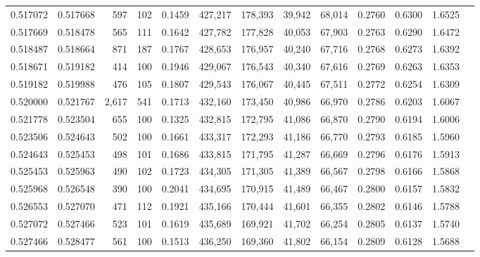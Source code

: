 \begin{tabular}{rrrrrrrrrrrrr}
0.517072 & 0.517668 &   597 & 102 &                                     0.1459 & 427,217 & 178,393 &  39,942 &  68,014 & 0.2760 & 0.6300 & 1.6525 \\
0.517669 & 0.518478 &   565 & 111 &                                     0.1642 & 427,782 & 177,828 &  40,053 &  67,903 & 0.2763 & 0.6290 & 1.6472 \\
0.518487 & 0.518664 &   871 & 187 &                                     0.1767 & 428,653 & 176,957 &  40,240 &  67,716 & 0.2768 & 0.6273 & 1.6392 \\
0.518671 & 0.519182 &   414 & 100 &                                     0.1946 & 429,067 & 176,543 &  40,340 &  67,616 & 0.2769 & 0.6263 & 1.6353 \\
0.519182 & 0.519988 &   476 & 105 &                                     0.1807 & 429,543 & 176,067 &  40,445 &  67,511 & 0.2772 & 0.6254 & 1.6309 \\
0.520000 & 0.521767 & 2,617 & 541 &                                     0.1713 & 432,160 & 173,450 &  40,986 &  66,970 & 0.2786 & 0.6203 & 1.6067 \\
0.521778 & 0.523504 &   655 & 100 &                                     0.1325 & 432,815 & 172,795 &  41,086 &  66,870 & 0.2790 & 0.6194 & 1.6006 \\
0.523506 & 0.524643 &   502 & 100 &                                     0.1661 & 433,317 & 172,293 &  41,186 &  66,770 & 0.2793 & 0.6185 & 1.5960 \\
0.524643 & 0.525453 &   498 & 101 &                                     0.1686 & 433,815 & 171,795 &  41,287 &  66,669 & 0.2796 & 0.6176 & 1.5913 \\
0.525453 & 0.525963 &   490 & 102 &                                     0.1723 & 434,305 & 171,305 &  41,389 &  66,567 & 0.2798 & 0.6166 & 1.5868 \\
0.525968 & 0.526548 &   390 & 100 &                                     0.2041 & 434,695 & 170,915 &  41,489 &  66,467 & 0.2800 & 0.6157 & 1.5832 \\
0.526553 & 0.527070 &   471 & 112 &                                     0.1921 & 435,166 & 170,444 &  41,601 &  66,355 & 0.2802 & 0.6146 & 1.5788 \\
0.527072 & 0.527466 &   523 & 101 &                                     0.1619 & 435,689 & 169,921 &  41,702 &  66,254 & 0.2805 & 0.6137 & 1.5740 \\
0.527466 & 0.528477 &   561 & 100 &                                     0.1513 & 436,250 & 169,360 &  41,802 &  66,154 & 0.2809 & 0.6128 & 1.5688 \\

\end{tabular}
